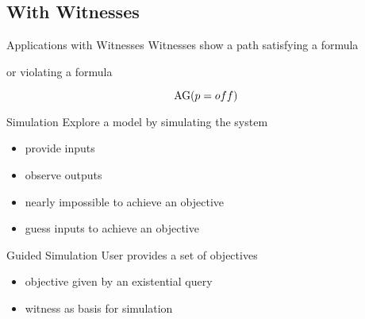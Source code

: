 \subsection{With Witnesses} 

\begin{frame}{Applications with Witnesses}
  Witnesses show a path satisfying a formula
  
  \vfill
  
  or violating a formula
  
  \[ \operatorname{AG} (p = off) \]
\end{frame}

\begin{frame}[plain]
  \vfill

  \begin{center}
  \end{center}

  \vfill
\end{frame}

\begin{frame}{Simulation}
  Explore a model by simulating the system
  \begin{itemize}
    \item provide inputs 
    \item observe outputs
  \end{itemize}

  \vfill

  \begin{itemize}
    \item nearly impossible to achieve an objective
    \item guess inputs to achieve an objective
  \end{itemize}
\end{frame}

\begin{frame}{Guided Simulation}
  User provides a set of objectives
  \begin{itemize}
    \item objective given by an existential query
    \item witness as basis for simulation
  \end{itemize}
\end{frame}

